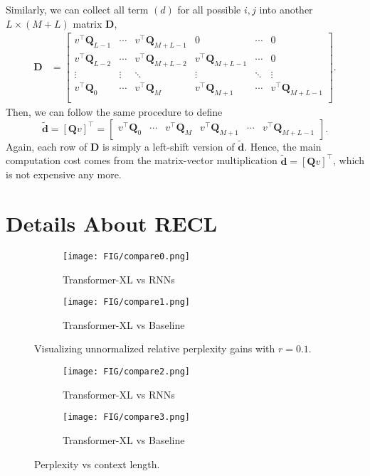 \documentclass[11pt,a4paper]{article}
\def\rvd{{\mathbf{d}}}
\def\rmD{{\mathbf{D}}}
\def\rmQ{{\mathbf{Q}}}
\begin{document}
Similarly, we can collect all term $(d)$ for all possible $i, j$ into another $L \times (M+L)$ matrix $\rmD$,
\begin{align*}
	\rmD &=
	\begin{bmatrix}
	v^\top \rmQ_{L-1} & \cdots & v^\top \rmQ_{M+L-1} & 0 & \cdots & 0 \\
	v^\top \rmQ_{L-2} & \cdots & v^\top \rmQ_{M+L-2} & v^\top \rmQ_{M+L-1} & \cdots & 0 \\
	\vdots            & \vdots & \ddots              & \vdots              & \ddots & \vdots     \\
	v^\top \rmQ_{0}   & \cdots & v^\top \rmQ_{M}     & v^\top \rmQ_{M+1}   & \cdots & v^\top \rmQ_{M+L-1} \\
	\end{bmatrix}.
\end{align*}
Then, we can follow the same procedure to define
\[
\widetilde{\rvd} = \left[\rmQ v \right]^\top
	=
	\begin{bmatrix}
	v^\top \rmQ_{0}   & \cdots & v^\top \rmQ_{M}     & v^\top \rmQ_{M+1}   & \cdots & v^\top \rmQ_{M+L-1}
	\end{bmatrix}.
\]
Again, each row of $\rmD$ is simply a left-shift version of $\widetilde{\rvd}$.
Hence, the main computation cost comes from the matrix-vector multiplication $\widetilde{\rvd} = \left[\rmQ v \right]^\top$, which is not expensive any more.

\section{Details About RECL} \label{sec:recl}
\begin{figure}[!h]
	\begin{subfigure}[b]{0.5\textwidth}
		\texttt{[image: FIG/compare0.png]}
		\caption{Transformer-XL vs RNNs}
		\label{fig:vsrnn}
	\end{subfigure}
	\begin{subfigure}[b]{0.5\textwidth}
		\texttt{[image: FIG/compare1.png]}
		\caption{Transformer-XL vs Baseline}
		\label{fig:vsbase}
	\end{subfigure}
	\caption{Visualizing unnormalized relative perplexity gains with $r = 0.1$.}
	\label{fig:gain}
\end{figure}

\begin{figure}[!h]
	\begin{subfigure}[b]{0.5\textwidth}
		\texttt{[image: FIG/compare2.png]}
		\caption{Transformer-XL vs RNNs}
		\label{fig:vsrnn}
	\end{subfigure}
	\begin{subfigure}[b]{0.5\textwidth}
		\texttt{[image: FIG/compare3.png]}
		\caption{Transformer-XL vs Baseline}
		\label{fig:vsbase}
	\end{subfigure}
	\caption{Perplexity vs context length.}
	\label{fig:context}
\end{figure}
\end{document}
